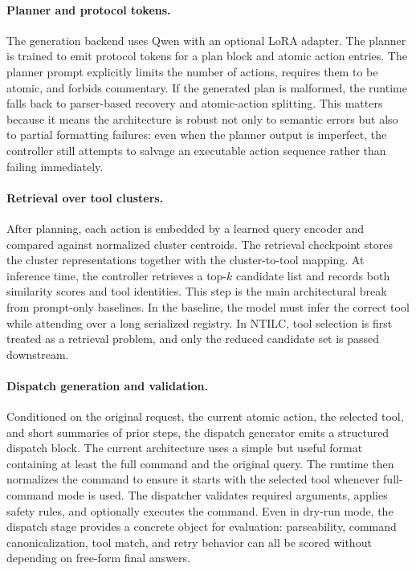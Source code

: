 \documentclass[10pt,twocolumn,letterpaper]{article}
\newcommand{\method}{NTILC}
\begin{document}
\paragraph{Planner and protocol tokens.}
The generation backend uses Qwen with an optional LoRA adapter. The planner is trained to emit protocol tokens for a plan block and atomic action entries. The planner prompt explicitly limits the number of actions, requires them to be atomic, and forbids commentary. If the generated plan is malformed, the runtime falls back to parser-based recovery and atomic-action splitting. This matters because it means the architecture is robust not only to semantic errors but also to partial formatting failures: even when the planner output is imperfect, the controller still attempts to salvage an executable action sequence rather than failing immediately.

\paragraph{Retrieval over tool clusters.}
After planning, each action is embedded by a learned query encoder and compared against normalized cluster centroids. The retrieval checkpoint stores the cluster representations together with the cluster-to-tool mapping. At inference time, the controller retrieves a top-$k$ candidate list and records both similarity scores and tool identities. This step is the main architectural break from prompt-only baselines. In the baseline, the model must infer the correct tool while attending over a long serialized registry. In \method, tool selection is first treated as a retrieval problem, and only the reduced candidate set is passed downstream.

\paragraph{Dispatch generation and validation.}
Conditioned on the original request, the current atomic action, the selected tool, and short summaries of prior steps, the dispatch generator emits a structured dispatch block. The current architecture uses a simple but useful format containing at least the full command and the original query. The runtime then normalizes the command to ensure it starts with the selected tool whenever full-command mode is used. The dispatcher validates required arguments, applies safety rules, and optionally executes the command. Even in dry-run mode, the dispatch stage provides a concrete object for evaluation: parseability, command canonicalization, tool match, and retry behavior can all be scored without depending on free-form final answers.
\end{document}
